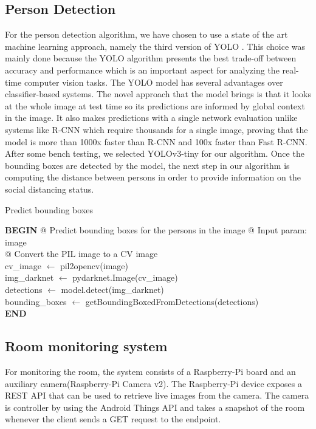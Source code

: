 \documentclass[runningheads,a4paper,11pt]{report}
\begin{document}
\subsection{Person Detection}
For the person detection algorithm, we have chosen to use a state of the art machine learning approach, namely the third version of YOLO \cite{YOLO}. This choice was mainly done because the YOLO algorithm presents the best trade-off between accuracy and performance which is an important aspect for analyzing the real-time computer vision tasks. The YOLO model has several advantages over classifier-based systems. The novel approach that the model brings is that it looks at the whole image at test time so its predictions are informed by global context in the image. It also makes predictions with a single network evaluation unlike systems like R-CNN which require thousands for a single image, proving that the model is more than 1000x faster than R-CNN and 100x faster than Fast R-CNN. After some bench testing, we selected YOLOv3-tiny for our algorithm. Once the bounding boxes are detected by the model, the next step in our algorithm is computing the distance between persons in order to provide information on the social distancing status. 
\begin{algorithm}
	\caption{Predict bounding boxes}
	\label{NGalg}
		\begin{algorithmic}
		\STATE \textbf{BEGIN}
  		\STATE @ Predict bounding boxes for the persons in the image
  		\STATE @ Input param: image \\
  		\STATE @ Convert the PIL image to a CV image \\
  		\STATE cv\_image $\leftarrow$ pil2opencv(image) \\
  		\STATE img\_darknet $\leftarrow$ pydarknet.Image(cv\_image) \\
  		\STATE detections $\leftarrow$ model.detect(img\_darknet) \\
  		\STATE bounding\_boxes $\leftarrow$ getBoundingBoxedFromDetections(detections) \\
  		\STATE \textbf{END}
\end{algorithmic}
\end{algorithm}

\subsection{Room monitoring system}
For monitoring the room, the system consists of a Raspberry-Pi board and an auxiliary camera(Raspberry-Pi Camera v2). The Raspberry-Pi device exposes a REST API that can be used to retrieve live images from the camera. The camera is controller by using the Android Things API and takes a snapshot of the room whenever the client sends a GET request to the endpoint.
\end{document}
